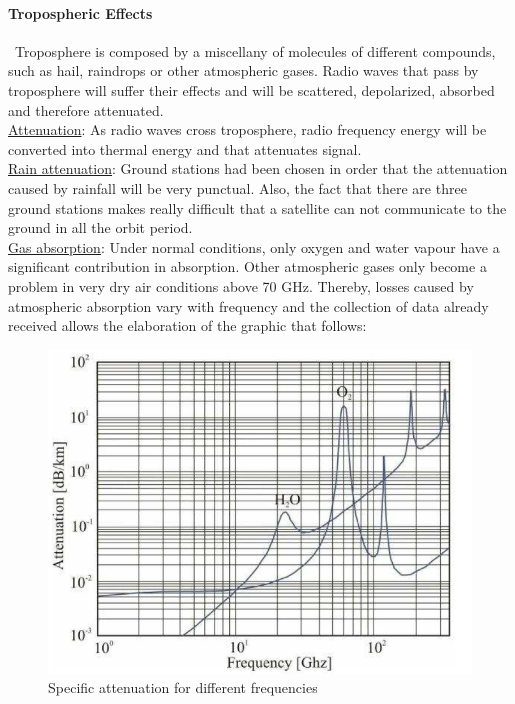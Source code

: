 \paragraph{Tropospheric Effects \cite{Jorge2012}}
\ Troposphere is composed by a miscellany of molecules of different compounds, such as hail, raindrops or other atmospheric gases. Radio waves that pass by troposphere will suffer their effects and will be scattered, depolarized, absorbed and therefore attenuated.\\
\underline{Attenuation}: As radio waves cross troposphere, radio frequency energy will be converted into thermal energy and that attenuates signal.\\
\underline{Rain attenuation}: Ground stations had been chosen in order that the attenuation caused by rainfall will be very punctual. Also, the fact that there are three ground stations makes really difficult that a satellite can not communicate to the ground in all the orbit period.\\
\underline{Gas absorption}: Under normal conditions, only oxygen and water vapour have a significant contribution
in absorption. Other atmospheric gases only become a problem in very dry air
conditions above 70 GHz.
Thereby, losses caused by atmospheric absorption vary with frequency and the
collection of data already received allows the elaboration of the graphic that follows:
\begin{figure}[h]
	\includegraphics[scale=0.7]{./sections/SatelliteDept/sections/images/specificAttenuation}
	\centering
	\caption{Specific attenuation for different frequencies \cite{Jorge2012}}
	\label{specificAtenuattion}
\end{figure}
\\

